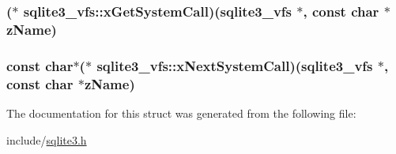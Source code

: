 \hypertarget{structsqlite3__vfs_604384e58c645e06b6db38d8a45e1103}{
\subsubsection[xGetSystemCall]{($\ast$ {\bf sqlite3\_\-vfs::xGetSystemCall})({\bf sqlite3\_\-vfs} $\ast$, const char $\ast${\bf zName})}}
\label{structsqlite3__vfs_604384e58c645e06b6db38d8a45e1103}


\hypertarget{structsqlite3__vfs_1c5be20255f3458db1b4badbd96dd1dc}{
\subsubsection[xNextSystemCall]{\setlength{\rightskip}{0pt plus 5cm}const char$\ast$($\ast$ {\bf sqlite3\_\-vfs::xNextSystemCall})({\bf sqlite3\_\-vfs} $\ast$, const char $\ast${\bf zName})}}
\label{structsqlite3__vfs_1c5be20255f3458db1b4badbd96dd1dc}




The documentation for this struct was generated from the following file:\begin{CompactItemize}
\item 
include/\hyperlink{sqlite3_8h}{sqlite3.h}\end{CompactItemize}
